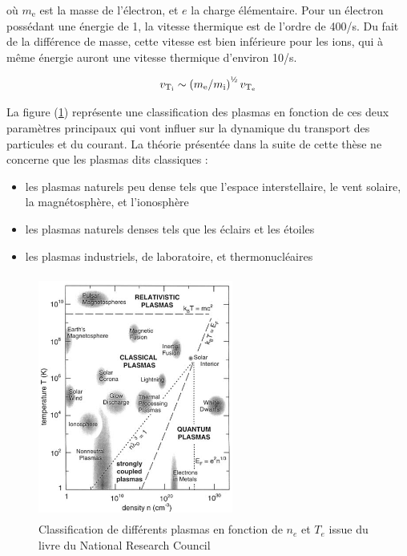 \begin{refsection}
où $m_\text{e}$ est la masse de l'électron, et $e$ la charge élémentaire. Pour un électron possédant
une énergie de \unit{1}{\electronvolt}, la vitesse thermique est de l'ordre de
\unit{400}{\kilo\meter}/s.
Du fait de la différence de masse, cette vitesse est bien inférieure pour les
ions, qui à même énergie auront une vitesse thermique d'environ
\unit{10}{\kilo\meter}/s.

\begin{equation}
	v_{\text{T}_\text{i}}\sim\left(m_\text{e}/m_\text{i}\right)^{\text{\textonehalf}}
	v_{\text{T}_\text{e}}
\end{equation}

La figure (\ref{zoologie}) représente une classification des plasmas
en fonction de ces deux paramètres principaux qui vont influer sur la dynamique du
transport des particules et du courant.
La théorie présentée dans la suite de cette thèse ne concerne que les plasmas
dits classiques :

\begin{itemize}
  \item les plasmas naturels peu dense tels que l'espace interstellaire,
  le vent solaire, la magnétosphère, et l'ionosphère
  \item les plasmas naturels denses tels que les éclairs et les étoiles
  \item les plasmas industriels, de laboratoire, et thermonucléaires
\end{itemize}

\begin{figure}[htbp]
\centering
\includegraphics[height=80mm,width=64mm]{figures/1-zoologie.png}{\caption{Classification
de différents plasmas en fonction de $n_e$ et $T_e$ issue du livre du National
Research Council \parencite{NRC}}\label{zoologie}}
\end{figure}


\end{refsection}
